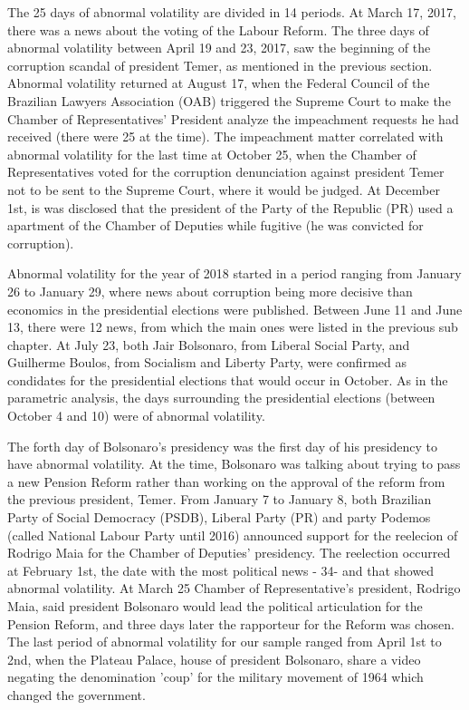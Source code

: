 \documentclass[a4paper]{article}
\begin{document}




The 25 days of abnormal volatility are divided in 14 periods. At March 17, 2017, there was a news about the voting of the Labour Reform. The three days of abnormal volatility between April 19 and 23, 2017, saw the beginning of the corruption scandal of president Temer, as mentioned in the previous section. Abnormal volatility returned at August 17, when the Federal Council of the Brazilian Lawyers Association (OAB) triggered the Supreme Court to make the Chamber of Representatives' President analyze the impeachment requests he had received (there were 25 at the time). The impeachment matter correlated with abnormal volatility for the last time at October 25, when the Chamber of Representatives voted for the corruption denunciation against president Temer not to be sent to the Supreme Court, where it would be judged. At December 1st, is was disclosed that the president of the Party of the Republic (PR) used a apartment of the Chamber of Deputies while fugitive (he was convicted for corruption).

Abnormal volatility for the year of 2018 started in a period ranging from January 26 to January 29, where news about corruption being more decisive than economics in the presidential elections were published. Between June 11 and June 13, there were 12 news, from which the main ones were listed in the previous sub chapter. At July 23, both Jair Bolsonaro, from Liberal Social Party, and Guilherme Boulos, from Socialism and Liberty Party, were confirmed as condidates for the presidential elections that would occur in October. As in the parametric analysis, the days surrounding the presidential elections (between October 4 and 10) were of abnormal volatility.


The forth day of Bolsonaro's presidency was the first day of his presidency to have abnormal volatility. At the time, Bolsonaro was talking about trying to pass a new Pension Reform rather than working on the approval of the reform from the previous president, Temer. From January 7 to January 8, both Brazilian Party of Social Democracy (PSDB), Liberal Party (PR) and party Podemos (called National Labour Party until 2016) announced support for the reelecion of Rodrigo Maia for the Chamber of Deputies' presidency. The reelection occurred at February 1st, the date with the most political news - 34- and that showed abnormal volatility. At March 25 Chamber of Representative's president, Rodrigo Maia, said president Bolsonaro would lead the political articulation for the Pension Reform, and three days later the rapporteur for the Reform was chosen. The last period of abnormal volatility for our sample ranged from April 1st to 2nd, when the Plateau Palace, house of president Bolsonaro, share a video negating the denomination 'coup' for the military movement of 1964 which changed the government.
\end{document}
